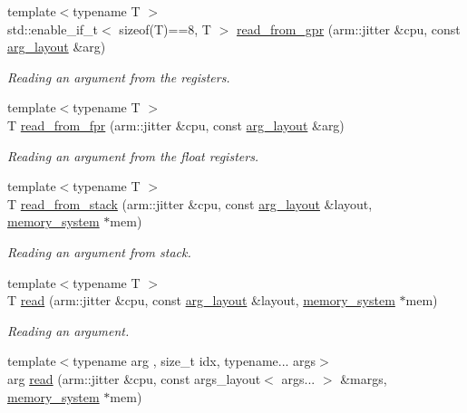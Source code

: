 \begin{DoxyCompactItemize}
\item 
{\footnotesize template$<$typename T $>$ }\\std\+::enable\+\_\+if\+\_\+t$<$ sizeof(T)==8, T $>$ \mbox{\hyperlink{namespaceeka2l1_1_1hle_a968725b7666c3d213e81ac7265711168}{read\+\_\+from\+\_\+gpr}} (arm\+::jitter \&cpu, const \mbox{\hyperlink{structeka2l1_1_1hle_1_1arg__layout}{arg\+\_\+layout}} \&arg)
\begin{DoxyCompactList}\small\item\em Reading an argument from the registers. \end{DoxyCompactList}\item 
{\footnotesize template$<$typename T $>$ }\\T \mbox{\hyperlink{namespaceeka2l1_1_1hle_a06dcf3812cb3b4a4da72776119725804}{read\+\_\+from\+\_\+fpr}} (arm\+::jitter \&cpu, const \mbox{\hyperlink{structeka2l1_1_1hle_1_1arg__layout}{arg\+\_\+layout}} \&arg)
\begin{DoxyCompactList}\small\item\em Reading an argument from the float registers. \end{DoxyCompactList}\item 
{\footnotesize template$<$typename T $>$ }\\T \mbox{\hyperlink{namespaceeka2l1_1_1hle_a03511f857172408b7e75dfef5c97b7d5}{read\+\_\+from\+\_\+stack}} (arm\+::jitter \&cpu, const \mbox{\hyperlink{structeka2l1_1_1hle_1_1arg__layout}{arg\+\_\+layout}} \&layout, \mbox{\hyperlink{classeka2l1_1_1memory__system}{memory\+\_\+system}} $\ast$mem)
\begin{DoxyCompactList}\small\item\em Reading an argument from stack. \end{DoxyCompactList}\item 
{\footnotesize template$<$typename T $>$ }\\T \mbox{\hyperlink{namespaceeka2l1_1_1hle_af2d821b701c6bea2502bce0082bf559f}{read}} (arm\+::jitter \&cpu, const \mbox{\hyperlink{structeka2l1_1_1hle_1_1arg__layout}{arg\+\_\+layout}} \&layout, \mbox{\hyperlink{classeka2l1_1_1memory__system}{memory\+\_\+system}} $\ast$mem)
\begin{DoxyCompactList}\small\item\em Reading an argument. \end{DoxyCompactList}\item 
{\footnotesize template$<$typename arg , size\+\_\+t idx, typename... args$>$ }\\arg \mbox{\hyperlink{namespaceeka2l1_1_1hle_a64973765adfec41cb53c96858b46cd22}{read}} (arm\+::jitter \&cpu, const args\+\_\+layout$<$ args... $>$ \&margs, \mbox{\hyperlink{classeka2l1_1_1memory__system}{memory\+\_\+system}} $\ast$mem)

\end{DoxyCompactItemize}
